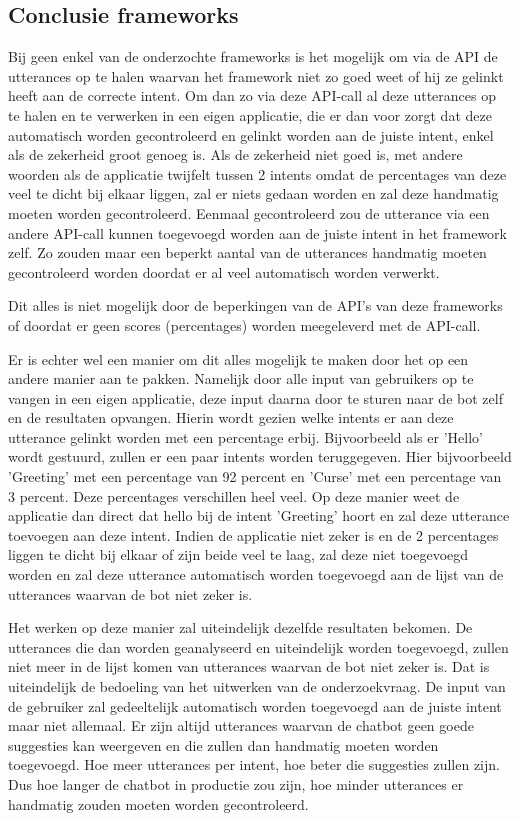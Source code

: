 \subsection{Conclusie frameworks}
\label{conclusieFrameworks}

Bij geen enkel van de onderzochte frameworks is het mogelijk om via de API de utterances op te halen waarvan het framework niet zo goed weet of hij ze gelinkt heeft aan de correcte intent. Om dan zo via deze API-call al deze utterances op te halen en te verwerken in een eigen applicatie, die er dan voor zorgt dat deze automatisch worden gecontroleerd en gelinkt worden aan de juiste intent, enkel als de zekerheid groot genoeg is. Als de zekerheid niet goed is, met andere woorden als de applicatie twijfelt tussen 2 intents omdat de percentages van deze veel te dicht bij elkaar liggen, zal er niets gedaan worden en zal deze handmatig moeten worden gecontroleerd. Eenmaal gecontroleerd zou de utterance via een andere API-call kunnen toegevoegd worden aan de juiste intent in het framework zelf. Zo zouden maar een beperkt aantal van de utterances handmatig moeten gecontroleerd worden doordat er al veel automatisch worden verwerkt.

Dit alles is niet mogelijk door de beperkingen van de API's van deze frameworks of doordat er geen scores (percentages) worden meegeleverd met de API-call.

Er is echter wel een manier om dit alles mogelijk te maken door het op een andere manier aan te pakken. Namelijk door alle input van gebruikers op te vangen in een eigen applicatie, deze input daarna door te sturen naar de bot zelf en de resultaten opvangen. Hierin wordt gezien welke intents er aan deze utterance gelinkt worden met een percentage erbij. Bijvoorbeeld als er 'Hello' wordt gestuurd, zullen er een paar intents worden teruggegeven. Hier bijvoorbeeld 'Greeting' met een percentage van 92 percent en 'Curse' met een percentage van 3 percent. Deze percentages verschillen heel veel. Op deze manier weet de applicatie dan direct dat hello bij de intent 'Greeting' hoort en zal deze utterance toevoegen aan deze intent. Indien de applicatie niet zeker is en de 2 percentages liggen te dicht bij elkaar of zijn beide veel te laag, zal deze niet toegevoegd worden en zal deze utterance automatisch worden toegevoegd aan de lijst van de utterances waarvan de bot niet zeker is.

Het werken op deze manier zal uiteindelijk dezelfde resultaten bekomen. De utterances die dan worden geanalyseerd en uiteindelijk worden toegevoegd, zullen niet meer in de lijst komen van utterances waarvan de bot niet zeker is. Dat is uiteindelijk de bedoeling van het uitwerken van de onderzoekvraag. De input van de gebruiker zal gedeeltelijk automatisch worden toegevoegd aan de juiste intent maar niet allemaal. Er zijn altijd utterances waarvan de chatbot geen goede suggesties kan weergeven en die zullen dan handmatig moeten worden toegevoegd. Hoe meer utterances per intent, hoe beter die suggesties zullen zijn. Dus hoe langer de chatbot in productie zou zijn, hoe minder utterances er handmatig zouden moeten worden gecontroleerd.

